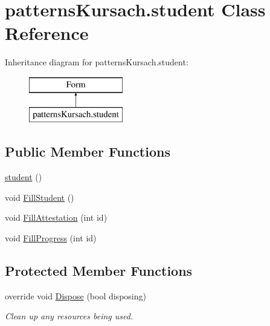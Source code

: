 \hypertarget{classpatterns_kursach_1_1student}{}\section{patterns\+Kursach.\+student Class Reference}
\label{classpatterns_kursach_1_1student}
Inheritance diagram for patterns\+Kursach.\+student\+:\begin{figure}[H]
\begin{center}
\leavevmode
\includegraphics[height=2.000000cm]{classpatterns_kursach_1_1student}
\end{center}
\end{figure}
\subsection*{Public Member Functions}
\begin{DoxyCompactItemize}
\item 
\mbox{\hyperlink{classpatterns_kursach_1_1student_abd0837e0e333877deea0dd7fc79af488}{student}} ()
\item 
void \mbox{\hyperlink{classpatterns_kursach_1_1student_a30dbbf1f0706e7dbac498e79ee42596a}{Fill\+Student}} ()
\item 
void \mbox{\hyperlink{classpatterns_kursach_1_1student_ade5ff561a25e758c638244eeb3777f4d}{Fill\+Attestation}} (int id)
\item 
void \mbox{\hyperlink{classpatterns_kursach_1_1student_ae1bf1deff88ed100f318f8902739abd4}{Fill\+Progress}} (int id)
\end{DoxyCompactItemize}
\subsection*{Protected Member Functions}
\begin{DoxyCompactItemize}
\item 
override void \mbox{\hyperlink{classpatterns_kursach_1_1student_af69ff0dce6cd87c18aebf494b31a9e91}{Dispose}} (bool disposing)
\begin{DoxyCompactList}\small\item\em Clean up any resources being used. \end{DoxyCompactList}\end{DoxyCompactItemize}



